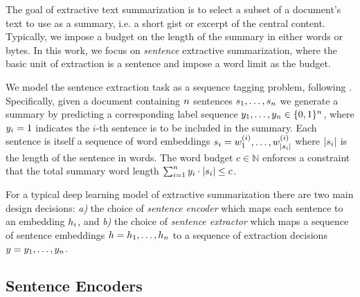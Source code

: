 The goal of extractive text summarization is to select a subset of a 
document's text to use as a summary, i.e. a short gist or excerpt of the 
central content.
Typically, we impose a budget on the length of the summary in either 
words or bytes. In this work, we focus on \textit{sentence} extractive 
summarization, 
where the basic unit of extraction is a sentence and impose a word limit as 
the budget.

We model the sentence extraction task as a sequence tagging problem, 
following \cite{}. 
Specifically, given a document containing $n$ sentences 
$\sent_1, \ldots, \sent_{\docSize}$ we generate a summary by predicting a 
corresponding label sequence $\slabel_1, \ldots, \slabel_{\docSize} 
\in \{0, 1\}^{\docSize}$, where $\slabel_i = 1$ 
indicates the $i$-th sentence is to be included in the summary.
Each sentence is itself a sequence of word embeddings 
$\sent[i] = \wordEmb[1]^{(i)}, \ldots, \wordEmb[{|\sent[i]|}]^{(i)}$ where
$|\sent[i]|$ is the length of the sentence in words.
The word budget $c \in \mathbb{N}$ 
enforces a constraint that the total summary word length 
$\sum_{i=1}^\docSize \slabel_i \cdot |\sent[i]| \le c$.








For a typical deep learning model of extractive 
summarization there are two main design decisions:
\textit{a)}  the choice of \textit{sentence encoder} 
which maps each sentence \sent[i] 
to an embedding $\sentEmb[i]$, 
and 
\textit{b)} the choice of \textit{sentence extractor} 
which maps a sequence of sentence embeddings 
$\sentEmb = \sentEmb[1],\ldots, \sentEmb[\docSize]$  
to a sequence of extraction
decisions $\slabel = \slabel_1,\ldots,\slabel_{\docSize}$.









\subsection{Sentence Encoders} \label{sec:senc}



